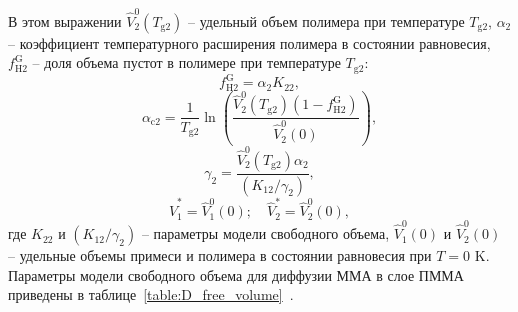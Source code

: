 В этом выражении $\hat{V}_2^0\left(T_{\mathrm{g} 2}\right)$ -- удельный объем полимера при температуре $T_\mathrm{g2}$, \linebreak $\alpha_2$ -- коэффициент температурного расширения полимера в состоянии равновесия, $f_{\mathrm{H} 2}^{\mathrm{G}}$ -- доля объема пустот в полимере при температуре $T_\mathrm{g2}$:
\begin{equation}
	f_{\mathrm{H} 2}^{\mathrm{G}}=\alpha_2 K_{22},
\end{equation}
\begin{equation}
	\alpha_{\mathrm{c} 2}=\frac{1}{T_{\mathrm{g} 2}} \ln \left(\frac{\hat{V}_2^0\left(T_{\mathrm{g} 2}\right)\left(1-f_{\mathrm{H} 2}^{\mathrm{G}}\right)}{\hat{V}_2^0(0)}\right),
\end{equation}
\begin{equation}
	\gamma_2=\frac{\hat{V}_2^0\left(T_{\mathrm{g} 2}\right) \alpha_2}{\left(K_{12} / \gamma_2\right)},
\end{equation}
\begin{equation}
	\hat{V}_1^*=\hat{V}_1^0(0); \hspace{1em} \hat{V}_2^*=\hat{V}_2^0(0),
\end{equation}
где $K_{22}$ и $\left(K_{12} / \gamma_2\right)$ -- параметры модели свободного объема, $\hat{V}_1^0(0)$ и $\hat{V}_2^0(0)$ -- удельные объемы примеси и полимера в состоянии равновесия при $T=0$ K. Параметры модели свободного объема для диффузии ММА в слое ПММА приведены в таблице~\ref{table:D_free_volume}~\cite{Tonge_free_volume_parameters}.

